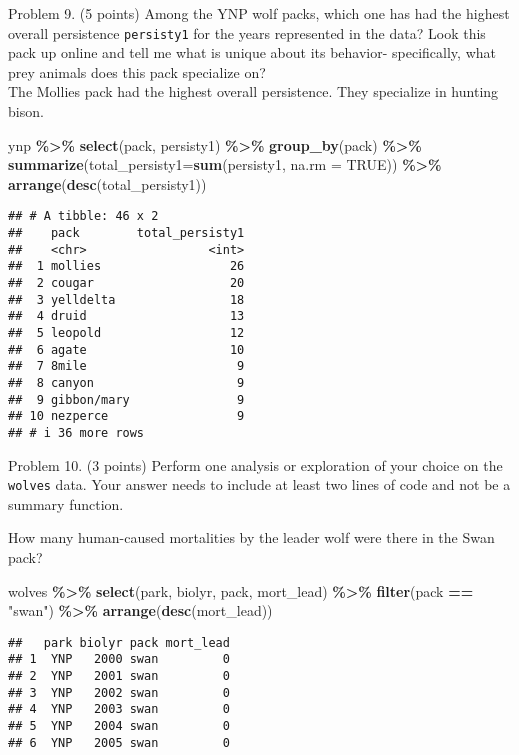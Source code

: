 \documentclass[
]{article}
\newenvironment{Shaded}{\begin{snugshade}}{\end{snugshade}}
\newcommand{\AttributeTok}[1]{\textcolor[rgb]{0.13,0.29,0.53}{#1}}
\newcommand{\ConstantTok}[1]{\textcolor[rgb]{0.56,0.35,0.01}{#1}}
\newcommand{\FunctionTok}[1]{\textcolor[rgb]{0.13,0.29,0.53}{\textbf{#1}}}
\newcommand{\NormalTok}[1]{#1}
\newcommand{\SpecialCharTok}[1]{\textcolor[rgb]{0.81,0.36,0.00}{\textbf{#1}}}
\newcommand{\StringTok}[1]{\textcolor[rgb]{0.31,0.60,0.02}{#1}}
\begin{document}
Problem 9. (5 points) Among the YNP wolf packs, which one has had the
highest overall persistence \texttt{persisty1} for the years represented
in the data? Look this pack up online and tell me what is unique about
its behavior- specifically, what prey animals does this pack specialize
on?\\
The Mollies pack had the highest overall persistence. They specialize in
hunting bison.

\begin{Shaded}
\begin{Highlighting}[]
\NormalTok{ynp }\SpecialCharTok{\%\textgreater{}\%} 
  \FunctionTok{select}\NormalTok{(pack, persisty1) }\SpecialCharTok{\%\textgreater{}\%} 
  \FunctionTok{group\_by}\NormalTok{(pack) }\SpecialCharTok{\%\textgreater{}\%} 
  \FunctionTok{summarize}\NormalTok{(}\AttributeTok{total\_persisty1=}\FunctionTok{sum}\NormalTok{(persisty1, }\AttributeTok{na.rm =} \ConstantTok{TRUE}\NormalTok{)) }\SpecialCharTok{\%\textgreater{}\%} 
  \FunctionTok{arrange}\NormalTok{(}\FunctionTok{desc}\NormalTok{(total\_persisty1))}
\end{Highlighting}
\end{Shaded}

\begin{verbatim}
## # A tibble: 46 x 2
##    pack        total_persisty1
##    <chr>                 <int>
##  1 mollies                  26
##  2 cougar                   20
##  3 yelldelta                18
##  4 druid                    13
##  5 leopold                  12
##  6 agate                    10
##  7 8mile                     9
##  8 canyon                    9
##  9 gibbon/mary               9
## 10 nezperce                  9
## # i 36 more rows
\end{verbatim}

Problem 10. (3 points) Perform one analysis or exploration of your
choice on the \texttt{wolves} data. Your answer needs to include at
least two lines of code and not be a summary function.

How many human-caused mortalities by the leader wolf were there in the
Swan pack?

\begin{Shaded}
\begin{Highlighting}[]
\NormalTok{wolves }\SpecialCharTok{\%\textgreater{}\%} 
  \FunctionTok{select}\NormalTok{(park, biolyr, pack, mort\_lead) }\SpecialCharTok{\%\textgreater{}\%} 
  \FunctionTok{filter}\NormalTok{(pack }\SpecialCharTok{==} \StringTok{"swan"}\NormalTok{) }\SpecialCharTok{\%\textgreater{}\%}
  \FunctionTok{arrange}\NormalTok{(}\FunctionTok{desc}\NormalTok{(mort\_lead))}
\end{Highlighting}
\end{Shaded}

\begin{verbatim}
##   park biolyr pack mort_lead
## 1  YNP   2000 swan         0
## 2  YNP   2001 swan         0
## 3  YNP   2002 swan         0
## 4  YNP   2003 swan         0
## 5  YNP   2004 swan         0
## 6  YNP   2005 swan         0
\end{verbatim}
\end{document}
